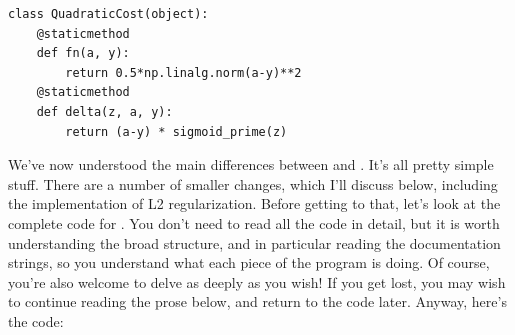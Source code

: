 \documentclass[a4paper,twoside,10pt]{book}
\begin{document}
\begin{lstlisting}
class QuadraticCost(object):
	@staticmethod
	def fn(a, y):
		return 0.5*np.linalg.norm(a-y)**2
	@staticmethod
	def delta(z, a, y):
		return (a-y) * sigmoid_prime(z)
\end{lstlisting}
We've now understood the main differences between  and . It's all pretty simple stuff. There are a number of smaller changes, which I'll discuss below, including the implementation of L2 regularization. Before getting to that, let's look at the complete code for . You don't need to read all the code in detail, but it is worth understanding the broad structure, and in particular reading the documentation strings, so you understand what each piece of the program is doing. Of course, you're also welcome to delve as deeply as you wish! If you get lost, you may wish to continue reading the prose below, and return to the code later. Anyway, here's the code:
\end{document}
